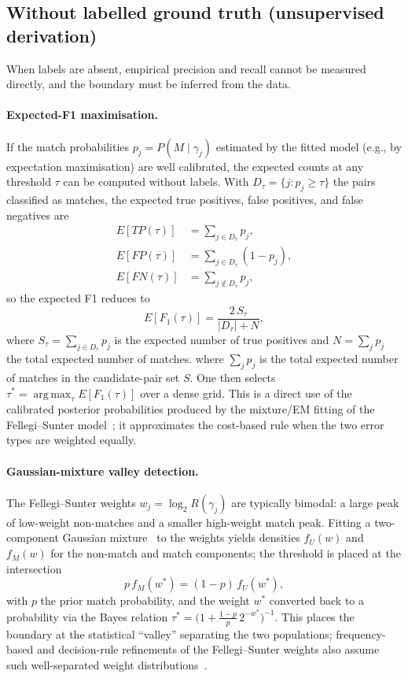 \documentclass[conference]{IEEEtran}
\begin{document}
\begin{appendices}
\subsection{Without labelled ground truth (unsupervised derivation)}
When labels are absent, empirical precision and recall cannot be measured directly, and the boundary must be inferred from the data.

\paragraph{Expected-F1 maximisation.} If the match probabilities $p_j=P(M\mid\gamma_j)$ estimated by the fitted model (e.g., by expectation maximisation) are well calibrated, the expected counts at any threshold $\tau$ can be computed without labels. With $D_\tau=\{j: p_j\ge \tau\}$ the pairs classified as matches, the expected true positives, false positives, and false negatives are
\[
\begin{aligned}
E[TP(\tau)]&=\sum_{j\in D_\tau}p_j,\\
E[FP(\tau)]&=\sum_{j\in D_\tau}(1-p_j),\\
E[FN(\tau)]&=\sum_{j\notin D_\tau}p_j,
\end{aligned}
\]
so the expected F1 reduces to
\[
E[F_1(\tau)]=\frac{2\,S_\tau}{|D_\tau|+N},
\]
where $S_\tau=\sum_{j\in D_\tau}p_j$ is the expected number of true positives and $N=\sum_{j}p_j$ the total expected number of matches.
where $\sum_j p_j$ is the total expected number of matches in the candidate-pair set $S$. One then selects $\tau^*=\operatorname{arg\,max}_\tau E[F_1(\tau)]$ over a dense grid. This is a direct use of the calibrated posterior probabilities produced by the mixture/EM fitting of the Fellegi--Sunter model~\cite{mclachlan2000,christen2012}; it approximates the cost-based rule when the two error types are weighted equally.

\paragraph{Gaussian-mixture valley detection.} The Fellegi--Sunter weights $w_j=\log_2 R(\gamma_j)$ are typically bimodal: a large peak of low-weight non-matches and a smaller high-weight match peak. Fitting a two-component Gaussian mixture~\cite{mclachlan2000} to the weights yields densities $f_U(w)$ and $f_M(w)$ for the non-match and match components; the threshold is placed at the intersection
\[
p\, f_M(w^*)=(1-p)\, f_U(w^*),
\]
with $p$ the prior match probability, and the weight $w^*$ converted back to a probability via the Bayes relation $\tau^*=\bigl(1+\frac{1-p}{p}\,2^{-w^*}\bigr)^{-1}$. This places the boundary at the statistical ``valley'' separating the two populations; frequency-based and decision-rule refinements of the Fellegi--Sunter weights also assume such well-separated weight distributions~\cite{winkler2000}.


\end{appendices}
\end{document}
